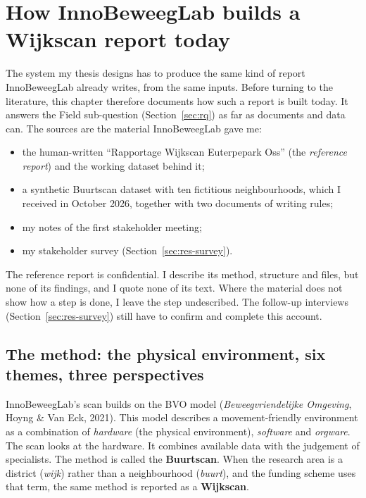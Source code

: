 \section{How InnoBeweegLab builds a Wijkscan report today}\label{sec:process}
\setcounter{figure}{0}
\setcounter{table}{0}

The system my thesis designs has to produce the same kind of report InnoBeweegLab already writes, from the same inputs. Before turning to the literature, this chapter therefore documents how such a report is built today. It answers the Field sub-question (Section~\ref{sec:rq}) as far as documents and data can. The sources are the material InnoBeweegLab gave me:
\begin{itemize}
\item the human-written \textquotedblleft{}Rapportage Wijkscan Euterpepark Oss\textquotedblright{} (the \textit{reference report}) and the working dataset behind it;
\item a synthetic Buurtscan dataset with ten fictitious neighbourhoods, which I received in October 2026, together with two documents of writing rules;
\item my notes of the first stakeholder meeting;
\item my stakeholder survey (Section~\ref{sec:res-survey}).
\end{itemize}
The reference report is confidential. I describe its method, structure and files, but none of its findings, and I quote none of its text. Where the material does not show how a step is done, I leave the step undescribed. The follow-up interviews (Section~\ref{sec:res-survey}) still have to confirm and complete this account.

\subsection{The method: the physical environment, six themes, three perspectives}\label{sec:process-method}

InnoBeweegLab's scan builds on the BVO model (\textit{Beweegvriendelijke Omgeving}, Hoyng \& Van Eck, 2021). This model describes a movement-friendly environment as a combination of \textit{hardware} (the physical environment), \textit{software} and \textit{orgware}. The scan looks at the hardware. It combines available data with the judgement of specialists. The method is called the \textbf{Buurtscan}. When the research area is a district (\textit{wijk}) rather than a neighbourhood (\textit{buurt}), and the funding scheme uses that term, the same method is reported as a \textbf{Wijkscan}.

